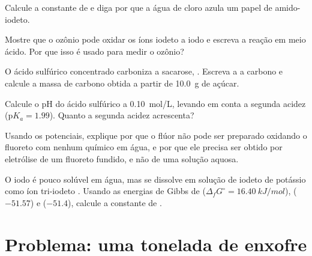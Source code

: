 \begin{exercise}[$\star\star$]\label{exo:b1:p-block-16-18:7}
Calcule a constante de  e diga por que a água
de cloro azula um papel de amido-iodeto.
\end{exercise}

\begin{exercise}[$\star\star$]\label{exo:b1:p-block-16-18:8}
Mostre que o ozônio pode oxidar os íons iodeto a iodo e escreva a reação
em meio ácido. Por que isso é usado para medir o ozônio?
\end{exercise}

\begin{exercise}[$\star\star$]\label{exo:b1:p-block-16-18:9}
O ácido sulfúrico concentrado carboniza a sacarose, .
Escreva a  a carbono e calcule a massa de carbono obtida a
partir de \qty{10.0}{g} de açúcar.
\end{exercise}

\begin{exercise}[$\star\star\star$]\label{exo:b1:p-block-16-18:10}
Calcule o pH do ácido sulfúrico a \qty{0.10}{mol/L}, levando em conta a
segunda acidez ($\mathrm{p}K_a = 1.99$). Quanto a segunda acidez
acrescenta?
\end{exercise}

\begin{exercise}[$\star\star\star$]\label{exo:b1:p-block-16-18:11}
Usando os potenciais, explique por que o flúor não pode ser preparado
oxidando o fluoreto com nenhum  químico em água, e por que ele
precisa ser obtido por eletrólise de um fluoreto fundido, e não de uma
solução aquosa.
\end{exercise}

\begin{exercise}[$\star\star\star$]\label{exo:b1:p-block-16-18:12}
O iodo é pouco solúvel em água, mas se dissolve em solução de iodeto de
potássio como íon tri-iodeto . Usando as energias de Gibbs de
 ($\Delta_f G^\circ = \qty{16.40}{kJ/mol}$),  ($-51.57$)
e  ($-51.4$), calcule a constante de .
\end{exercise}

\section{Problema: uma tonelada de enxofre}

